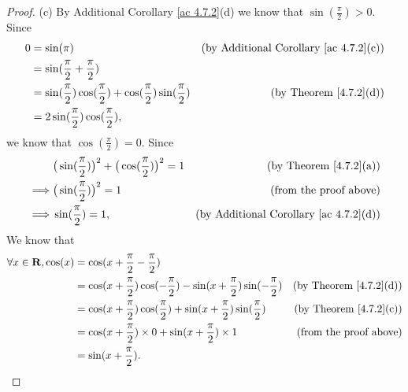 \begin{proof}{(c)}
    By Additional Corollary \ref{ac 4.7.2}(d) we know that \(\sin(\frac{\pi}{2}) > 0\).
    Since
    \begin{align*}
        0 & = \sin(\pi)                                                                         & \text{(by Additional Corollary \ref{ac 4.7.2}(c))} \\
          & = \sin(\frac{\pi}{2} + \frac{\pi}{2})                                                                                                    \\
          & = \sin(\frac{\pi}{2}) \cos(\frac{\pi}{2}) + \cos(\frac{\pi}{2}) \sin(\frac{\pi}{2}) & \text{(by Theorem \ref{4.7.2}(d))}                 \\
          & = 2 \sin(\frac{\pi}{2}) \cos(\frac{\pi}{2}),
    \end{align*}
    we know that \(\cos(\frac{\pi}{2}) = 0\).
    Since
    \begin{align*}
                 & \big(\sin(\frac{\pi}{2})\big)^2 + \big(\cos(\frac{\pi}{2})\big)^2 = 1 & \text{(by Theorem \ref{4.7.2}(a))}                 \\
        \implies & \big(\sin(\frac{\pi}{2})\big)^2 = 1                                   & \text{(from the proof above)}                      \\
        \implies & \sin(\frac{\pi}{2}) = 1,                                              & \text{(by Additional Corollary \ref{ac 4.7.2}(d))}
    \end{align*}
    We know that
    \begin{align*}
        \forall x \in \mathbf{R}, \cos(x) & = \cos(x + \frac{\pi}{2} - \frac{\pi}{2})                                                                                          \\
                                  & = \cos(x + \frac{\pi}{2}) \cos(-\frac{\pi}{2}) - \sin(x + \frac{\pi}{2}) \sin(-\frac{\pi}{2}) & \text{(by Theorem \ref{4.7.2}(d))} \\
                                  & = \cos(x + \frac{\pi}{2}) \cos(\frac{\pi}{2}) + \sin(x + \frac{\pi}{2}) \sin(\frac{\pi}{2})   & \text{(by Theorem \ref{4.7.2}(c))} \\
                                  & = \cos(x + \frac{\pi}{2}) \times 0 + \sin(x + \frac{\pi}{2}) \times 1                         & \text{(from the proof above)}      \\
                                  & = \sin(x + \frac{\pi}{2}).
    \end{align*}

\end{proof}
